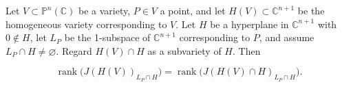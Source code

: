 Let $V \subset \mathbb{P}^n(\mathbb{C})$ be a variety, $P \in V$ a point, and let $H(V) \subset \mathbb{C}^{n+1}$ be the homogeneous variety corresponding to $V$. Let $H$ be a hyperplane in $\mathbb{C}^{n+1}$ with $0 \notin H$, let $L_P$ be the 1-subspace of $\mathbb{C}^{n+1}$ corresponding to $P$, and assume $L_P \cap H \neq \varnothing$. Regard $H(V) \cap H$ as a subvariety of $H$. Then

$$
\operatorname{rank}\bigl(J(H(V))_{L_P \cap H}\bigr) = \operatorname{rank}\bigl(J(H(V) \cap H)_{L_P \cap H}\bigr).
$$
